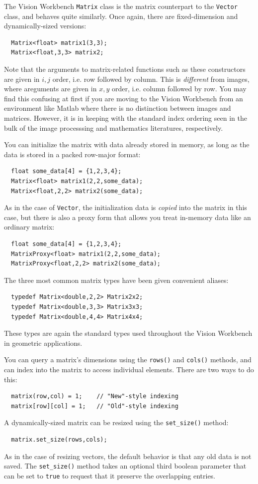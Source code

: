 The Vision Workbench \verb#Matrix# class is the matrix 
counterpart to the \verb#Vector# class, and behaves quite 
similarly.  Once again, there are fixed-dimension and 
dynamically-sized versions:
\begin{verbatim}
  Matrix<float> matrix1(3,3);
  Matrix<float,3,3> matrix2;
\end{verbatim}
Note that the arguments to matrix-related functions such 
as these constructors are given in $i,j$ order, i.e. row 
followed by column.  This is {\it different} from images, 
where areguments are given in $x,y$ order, i.e. column 
followed by row.  You may find this confusing at first if 
you are moving to the Vision Workbench from an environment 
like Matlab where there is no distinction between images 
and matrices.  However, it is in keeping with the standard 
index ordering seen in the bulk of the image processsing 
and mathematics literatures, respectively.

You can initialize the matrix with data already stored 
in memory, as long as the data is stored in a packed 
row-major format:
\begin{verbatim}
  float some_data[4] = {1,2,3,4};
  Matrix<float> matrix1(2,2,some_data);
  Matrix<float,2,2> matrix2(some_data);
\end{verbatim}
As in the case of \verb#Vector#, the initialization data 
is {\it copied} into the matrix in this case, but there is 
also a proxy form that allows you treat in-memory data 
like an ordinary matrix:
\begin{verbatim}
  float some_data[4] = {1,2,3,4};
  MatrixProxy<float> matrix1(2,2,some_data);
  MatrixProxy<float,2,2> matrix2(some_data);
\end{verbatim}
The three most common matrix types have been given 
convenient aliases:
\begin{verbatim}
  typedef Matrix<double,2,2> Matrix2x2;
  typedef Matrix<double,3,3> Matrix3x3;
  typedef Matrix<double,4,4> Matrix4x4;
\end{verbatim}
These types are again the standard types used throughout the Vision 
Workbench in geometric applications.

You can query a matrix's dimensions using the \verb#rows()# and 
\verb#cols()# methods, and can index into the matrix to access 
individual elements.  There are two ways to do this:
\begin{verbatim}
  matrix(row,col) = 1;    // "New"-style indexing
  matrix[row][col] = 1;   // "Old"-style indexing
\end{verbatim}
A dynamically-sized matrix can be resized using the 
\verb#set_size()# method:
\begin{verbatim}
  matrix.set_size(rows,cols);
\end{verbatim}
As in the case of resizing vectors, the default behavior is that any
old data is not saved.  The \verb#set_size()# method takes an optional
third boolean parameter that can be set to \verb#true# to request that
it preserve the overlapping entries.

